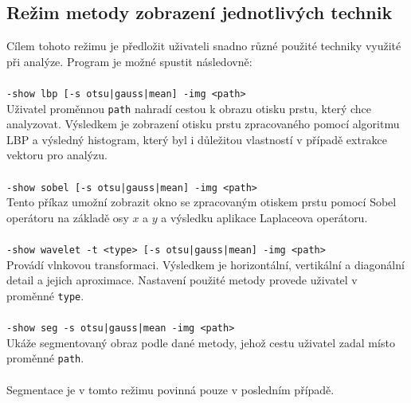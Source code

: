 \subsection{Režim metody zobrazení jednotlivých technik}
Cílem tohoto režimu je předložit uživateli snadno různé použité techniky využité při analýze. Program je možné spustit následovně:\\\\
\verb=-show lbp [-s otsu|gauss|mean] -img <path>=\\
Uživatel proměnnou \verb=path= nahradí cestou k obrazu otisku prstu, který chce analyzovat. Výsledkem je zobrazení otisku prstu zpracovaného pomocí algoritmu LBP a výsledný histogram, který byl i důležitou vlastností v případě extrakce vektoru pro analýzu.\\\\
\verb=-show sobel [-s otsu|gauss|mean] -img <path>=\\
Tento příkaz umožní zobrazit okno se zpracovaným otiskem prstu pomocí Sobel operátoru na základě osy $x$ a $y$ a výsledku aplikace Laplaceova operátoru.\\\\
\verb=-show wavelet -t <type> [-s otsu|gauss|mean] -img <path>=\\
Provádí vlnkovou transformaci. Výsledkem je horizontální, vertikální a diagonální detail a jejich aproximace. Nastavení použité metody provede uživatel v proměnné \verb=type=.\\\\
\verb=-show seg -s otsu|gauss|mean -img <path>=\\
Ukáže segmentovaný obraz podle dané metody, jehož cestu uživatel zadal místo proměnné \verb=path=.\\\\
Segmentace je v tomto režimu povinná pouze v posledním případě.

